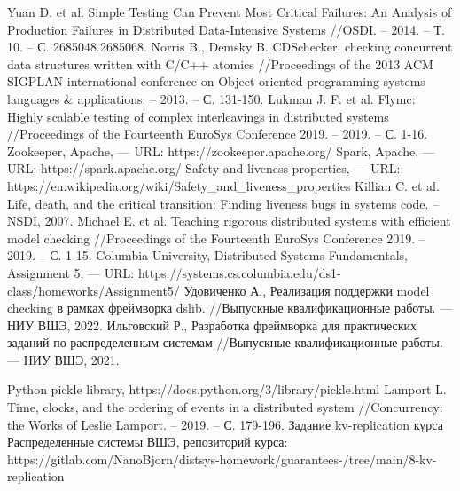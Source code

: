 \documentclass[a4paper,12pt]{extarticle}
\begin{document}
\begin{thebibliography}{00}
 Yuan D. et al. Simple Testing Can Prevent Most Critical Failures: An Analysis of Production Failures in Distributed Data-Intensive Systems //OSDI. – 2014. – Т. 10. – С. 2685048.2685068.
 Norris B., Demsky B. CDSchecker: checking concurrent data structures written with C/C++ atomics //Proceedings of the 2013 ACM SIGPLAN international conference on Object oriented programming systems languages \& applications. – 2013. – С. 131-150.
 Lukman J. F. et al. Flymc: Highly scalable testing of complex interleavings in distributed systems //Proceedings of the Fourteenth EuroSys Conference 2019. – 2019. – С. 1-16.
 Zookeeper, Apache, --- URL: https://zookeeper.apache.org/
 Spark, Apache, --- URL: https://spark.apache.org/
 Safety and liveness properties, --- URL: https://en.wikipedia.org/wiki/Safety\_and\_liveness\_properties
 Killian C. et al. Life, death, and the critical transition: Finding liveness bugs in systems code. – NSDI, 2007.
 Michael E. et al. Teaching rigorous distributed systems with efficient model checking //Proceedings of the Fourteenth EuroSys Conference 2019. – 2019. – С. 1-15.
 Columbia University, Distributed Systems Fundamentals, Assignment 5, --- URL: https://systems.cs.columbia.edu/ds1-class/homeworks/Assignment5/
 Удовиченко А., Реализация поддержки model checking в рамках фреймворка dslib. //Выпускные квалификационные работы. --- НИУ ВШЭ, 2022.  
 Ильговский Р., Разработка фреймворка для практических заданий по распределенным системам //Выпускные квалификационные работы. --- НИУ ВШЭ, 2021.

 Python pickle library, https://docs.python.org/3/library/pickle.html
 Lamport L. Time, clocks, and the ordering of events in a distributed system //Concurrency: the Works of Leslie Lamport. – 2019. – С. 179-196.
 Задание kv-replication курса Распределенные системы ВШЭ, репозиторий курса:  https://gitlab.com/NanoBjorn/distsys-homework/guarantees-/tree/main/8-kv-replication


\end{thebibliography}
\end{document}
